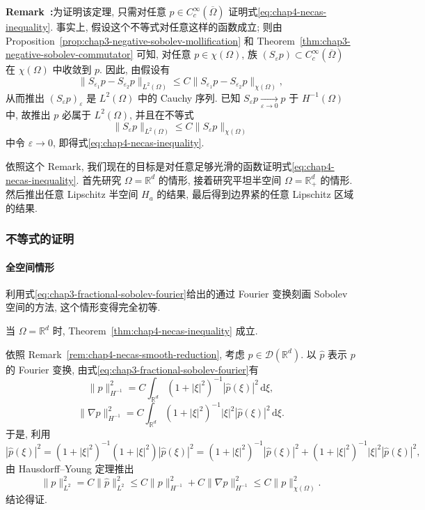 \par\noindent{}\textbf{Remark~\thechapterfoursectiononeremark:}\label{rem:chap4-necas-smooth-reduction}\quad 为证明该定理, 只需对任意 $p\in C_c^\infty(\overline\Omega)$ 证明式\eqref{eq:chap4-necas-inequality}. 事实上, 假设这个不等式对任意这样的函数成立; 则由 Proposition~\ref{prop:chap3-negative-sobolev-mollification} 和 Theorem~\ref{thm:chap3-negative-sobolev-commutator} 可知, 对任意 $p\in\chi(\Omega)$, 族 $(S_\varepsilon p)\subset C_c^\infty(\overline\Omega)$ 在 $\chi(\Omega)$ 中收敛到 $p$. 因此, 由假设有
\[
 \|S_{\varepsilon_1}p-S_{\varepsilon_2}p\|_{L^2(\Omega)}
 \leq C\|S_{\varepsilon_1}p-S_{\varepsilon_2}p\|_{\chi(\Omega)},
\]
从而推出 $(S_\varepsilon p)_\varepsilon$ 是 $L^2(\Omega)$ 中的 Cauchy 序列. 已知 $S_\varepsilon p\underset{\varepsilon\to0}{\longrightarrow}p$ 于 $H^{-1}(\Omega)$ 中, 故推出 $p$ 必属于 $L^2(\Omega)$, 并且在不等式
\[
 \|S_\varepsilon p\|_{L^2(\Omega)}
 \leq C\|S_\varepsilon p\|_{\chi(\Omega)}
\]
中令 $\varepsilon\to0$, 即得式\eqref{eq:chap4-necas-inequality}.

依照这个 Remark, 我们现在的目标是对任意足够光滑的函数证明式\eqref{eq:chap4-necas-inequality}. 首先研究 $\Omega=\mathbb R^d$ 的情形, 接着研究平坦半空间 $\Omega=\mathbb R_+^d$ 的情形. 然后推出任意 Lipschitz 半空间 $H_a$ 的结果, 最后得到边界紧的任意 Lipschitz 区域的结果.

\subsubsection{不等式的证明}
\label{subsec:chap4-necas-proof}

\paragraph{全空间情形}
\label{subsec:chap4-necas-whole-space}

利用式\eqref{eq:chap3-fractional-sobolev-fourier}给出的通过 Fourier 变换刻画 Sobolev 空间的方法, 这个情形变得完全初等.

\begin{Proposition}
\label{prop:chap4-necas-whole-space}
当 $\Omega=\mathbb R^d$ 时, Theorem~\ref{thm:chap4-necas-inequality} 成立.
\end{Proposition}

\begin{Proof}
依照 Remark~\ref{rem:chap4-necas-smooth-reduction}, 考虑 $p\in\mathcal D(\mathbb R^d)$. 以 $\widehat p$ 表示 $p$ 的 Fourier 变换, 由式\eqref{eq:chap3-fractional-sobolev-fourier}有
\[
 \|p\|_{H^{-1}}^2
 =C\int_{\mathbb R^d}(1+|\xi|^2)^{-1}|\widehat p(\xi)|^2\,\mathrm d\xi,
\]
\[
 \|\nabla p\|_{H^{-1}}^2
 =C\int_{\mathbb R^d}(1+|\xi|^2)^{-1}|\xi|^2|\widehat p(\xi)|^2\,\mathrm d\xi.
\]
于是, 利用
\[
 |\widehat p(\xi)|^2
 =(1+|\xi|^2)^{-1}(1+|\xi|^2)|\widehat p(\xi)|^2
 =(1+|\xi|^2)^{-1}|\widehat p(\xi)|^2
 +(1+|\xi|^2)^{-1}|\xi|^2|\widehat p(\xi)|^2,
\]
由 Hausdorff--Young 定理推出
\[
 \|p\|_{L^2}^2=C\|\widehat p\|_{L^2}^2
 \leq C\|p\|_{H^{-1}}^2+C\|\nabla p\|_{H^{-1}}^2
 \leq C\|p\|_{\chi(\Omega)}^2.
\]
结论得证.
\end{Proof}


